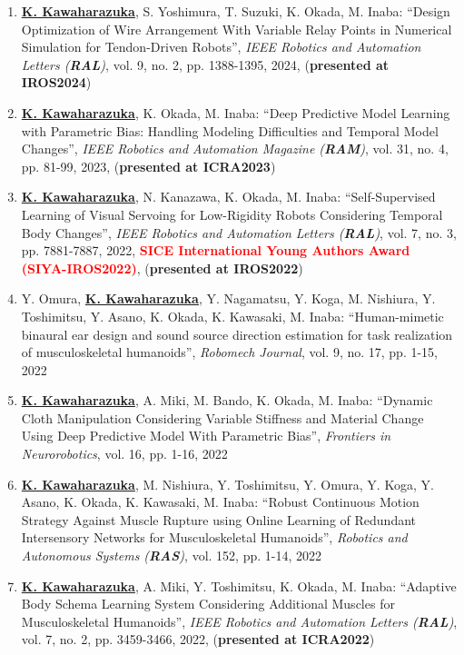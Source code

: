 \documentclass[letterpaper]{article}
\begin{document}
\begin{enumerate}
\item \underline{\textbf{K. Kawaharazuka}}, S. Yoshimura, T. Suzuki, K. Okada, M. Inaba: ``Design Optimization of Wire Arrangement With Variable Relay Points in Numerical Simulation for Tendon-Driven Robots'', \textit{IEEE Robotics and Automation Letters (\textit{\textbf{RAL}})}, vol. 9, no. 2, pp. 1388-1395, 2024, (\textbf{presented at IROS2024})
\item \underline{\textbf{K. Kawaharazuka}}, K. Okada, M. Inaba: ``Deep Predictive Model Learning with Parametric Bias: Handling Modeling Difficulties and Temporal Model Changes'', \textit{IEEE Robotics and Automation Magazine (\textit{\textbf{RAM}})}, vol. 31, no. 4, pp. 81-99, 2023, (\textbf{presented at ICRA2023})
\item \underline{\textbf{K. Kawaharazuka}}, N. Kanazawa, K. Okada, M. Inaba: ``Self-Supervised Learning of Visual Servoing for Low-Rigidity Robots Considering Temporal Body Changes'', \textit{IEEE Robotics and Automation Letters (\textit{\textbf{RAL}})}, vol. 7, no. 3, pp. 7881-7887, 2022, \textbf{\textcolor{red}{SICE International Young Authors Award (SIYA-IROS2022)}}, (\textbf{presented at IROS2022})
\item Y. Omura, \underline{\textbf{K. Kawaharazuka}}, Y. Nagamatsu, Y. Koga, M. Nishiura, Y. Toshimitsu, Y. Asano, K. Okada, K. Kawasaki, M. Inaba: ``Human-mimetic binaural ear design and sound source direction estimation for task realization of musculoskeletal humanoids'', \textit{Robomech Journal}, vol. 9, no. 17, pp. 1-15, 2022
\item \underline{\textbf{K. Kawaharazuka}}, A. Miki, M. Bando, K. Okada, M. Inaba: ``Dynamic Cloth Manipulation Considering Variable Stiffness and Material Change Using Deep Predictive Model With Parametric Bias'', \textit{Frontiers in Neurorobotics}, vol. 16, pp. 1-16, 2022
\item \underline{\textbf{K. Kawaharazuka}}, M. Nishiura, Y. Toshimitsu, Y. Omura, Y. Koga, Y. Asano, K. Okada, K. Kawasaki, M. Inaba: ``Robust Continuous Motion Strategy Against Muscle Rupture using Online Learning of Redundant Intersensory Networks for Musculoskeletal Humanoids'', \textit{Robotics and Autonomous Systems (\textit{\textbf{RAS}})}, vol. 152, pp. 1-14, 2022
\item \underline{\textbf{K. Kawaharazuka}}, A. Miki, Y. Toshimitsu, K. Okada, M. Inaba: ``Adaptive Body Schema Learning System Considering Additional Muscles for Musculoskeletal Humanoids'', \textit{IEEE Robotics and Automation Letters (\textit{\textbf{RAL}})}, vol. 7, no. 2, pp. 3459-3466, 2022, (\textbf{presented at ICRA2022})

\end{enumerate}
\end{document}
